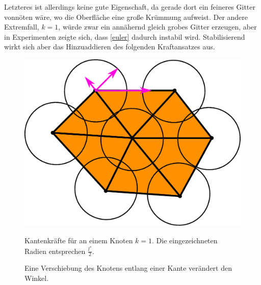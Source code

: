     Letzteres ist allerdings keine gute Eigenschaft, da gerade dort ein feineres Gitter vonnöten wäre, wo die Oberfläche eine große Krümmung
    aufweist.
    Der andere Extremfall, \( k=1 \), würde zwar ein annähernd gleich grobes Gitter erzeugen, aber in Experimenten zeigte sich, dass \eqref{euler}
    dadurch instabil wird. Stabilisierend wirkt sich aber das Hinzuaddieren des folgenden Kraftansatzes aus.
    \begin{figure}
      \begin{minipage}[t]{0.45\textwidth}
      \includegraphics[width=\textwidth]{bilder/meshCorrector/EdgeLaw.eps}
      \caption[Kantenkräfte für optimale Kantenlängen]{Kantenkräfte für an einem Knoten \( k = 1 \). Die eingezeichneten Radien entsprechen \( \frac{l^{*}}{2} \).}
      \label{edgeLaw}
      \end{minipage}
      \hfill
      \begin{minipage}[t]{0.45\textwidth}
      \caption[Winkeländerung durch Verschiebung]{Eine Verschiebung des Knotens entlang einer Kante verändert den Winkel.}
      \label{angleLaw}
      \end{minipage}
    \end{figure}

